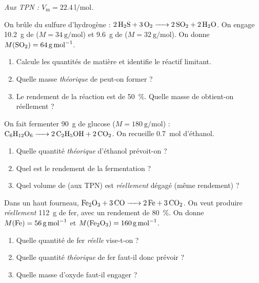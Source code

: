 \documentclass[11pt,a4paper]{article}
\begin{document}
\begin{center}\small\itshape
Aux TPN : $V_{\mathrm{m}}=\qty{22.4}{\litre\per\mole}$.
\end{center}

\begin{exo}
On brûle du sulfure d'hydrogène : $\ce{2 H2S + 3 O2 -> 2 SO2 + 2 H2O}$. On engage \qty{10.2}{\gram}
de  ($M=\qty{34}{\gram\per\mole}$) et \qty{9.6}{\gram} de 
($M=\qty{32}{\gram\per\mole}$). On donne $M(\ce{SO2})=\qty{64}{\gram\per\mole}$.
\begin{enumerate}[label=\alph*)]
  \item Calcule les quantités de matière et identifie le réactif limitant.
  \item Quelle masse \emph{théorique} de  peut-on former ?
  \item Le rendement de la réaction est de \qty{50}{\percent}. Quelle masse de  obtient-on réellement ?
\end{enumerate}
\end{exo}

\begin{exo}
On fait fermenter \qty{90}{\gram} de glucose ($M=\qty{180}{\gram\per\mole}$) :
$\ce{C6H12O6 -> 2 C2H5OH + 2 CO2}$. On recueille \qty{0.7}{\mole} d'éthanol.
\begin{enumerate}[label=\alph*)]
  \item Quelle quantité \emph{théorique} d'éthanol prévoit-on ?
  \item Quel est le rendement de la fermentation ?
  \item Quel volume de  (aux TPN) est \emph{réellement} dégagé (même rendement) ?
\end{enumerate}
\end{exo}

\begin{exo}
Dans un haut fourneau, $\ce{Fe2O3 + 3 CO -> 2 Fe + 3 CO2}$. On veut produire \emph{réellement}
\qty{112}{\gram} de fer, avec un rendement de \qty{80}{\percent}. On donne
$M(\ce{Fe})=\qty{56}{\gram\per\mole}$ et $M(\ce{Fe2O3})=\qty{160}{\gram\per\mole}$.
\begin{enumerate}[label=\alph*)]
  \item Quelle quantité de fer \emph{réelle} vise-t-on ?
  \item Quelle quantité \emph{théorique} de fer faut-il donc prévoir ?
  \item Quelle masse d'oxyde  faut-il engager ?
\end{enumerate}
\end{exo}
\end{document}
